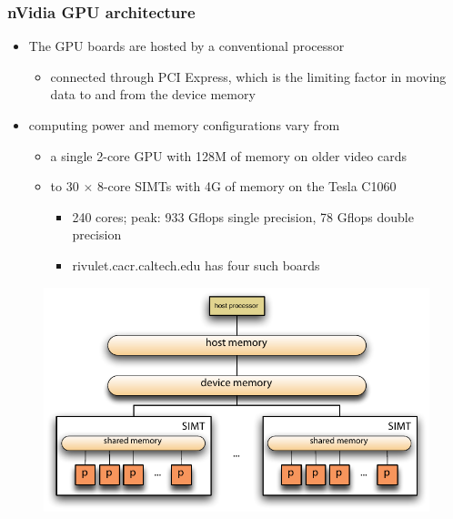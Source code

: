 \begin{frame}[fragile]
%
  \frametitle{nVidia GPU architecture}
%
  \begin{itemize}
  \item The GPU boards are hosted by a conventional processor
    \begin{itemize}
    \item connected through PCI Express, which is the limiting factor in moving data to and
      from the device memory
    \end{itemize}
  \item computing power and memory configurations vary from
    \begin{itemize}
    \item a single 2-core GPU with 128M of memory on older video cards
    \item to 30 $\times$ 8-core SIMTs with 4G of memory on the Tesla C1060
      \begin{itemize}
      \item 240 cores; peak: 933 Gflops single precision, 78 Gflops double precision
      \item rivulet.cacr.caltech.edu has four such boards
      \end{itemize}
    \end{itemize}
  \end{itemize}  
  
%
  \begin{figure}
    \centering
    \includegraphics[width=0.75\linewidth]{figures/cuda-architecture.pdf}
    \label{fig:simd}
  \end{figure}
%
\end{frame}

